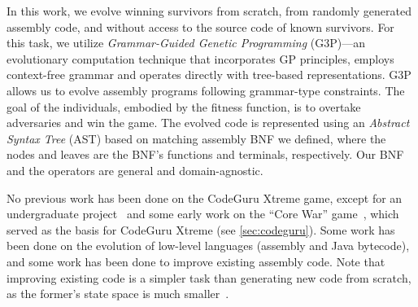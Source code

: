\documentclass[dvipsnames, format=sigconf]{acmart}
\begin{document}
In this work, we evolve winning survivors from scratch, \ie from randomly generated assembly code, and without access to the source code of known survivors. For this task, we utilize \textit{Grammar-Guided Genetic Programming} (G3P)---an evolutionary computation technique that incorporates GP principles, employs context-free grammar and operates directly with tree-based representations. G3P allows us to evolve assembly programs following grammar-type constraints. The goal of the individuals, embodied by the fitness function, is to overtake adversaries and win the game. The evolved code is represented using an \textit{Abstract Syntax Tree} (AST) based on matching assembly BNF we defined, where the nodes and leaves are the BNF's functions and terminals, respectively. Our BNF and the operators are general and domain-agnostic.


No previous work has been done on the CodeGuru Xtreme game, except for an undergraduate project~\cite{Darwin8086} and some early work on the ``Core War'' game~\cite{Andersen2001TheGE, corno2003exploiting}, which served as the basis for CodeGuru Xtreme (see \autoref{sec:codeguru}). %
Some work has been done on the evolution of low-level languages (\ie assembly and Java bytecode), and some work has been done %
to improve existing assembly code. Note that improving existing code is a simpler task than generating new code from scratch, as the former's state space is much smaller~\cite{Petke2018GeneticImprovementSoftware, Banzhaf2018SomeRemarksCode}. %

\end{document}

